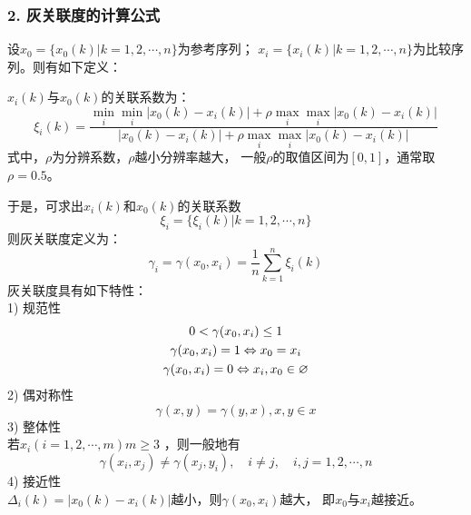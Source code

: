 \subsubsection*{2. 灰关联度的计算公式} 
设$x_0=\{x_0(k)|k=1,2, \cdots ,n\}$为参考序列；
$x_i=\{x_i(k)|k=1,2, \cdots ,n\}$为比较序列。则有如下定义：

$x_i(k)$与$x_0(k)$的关联系数为：
\begin{equation}
\xi_i(k)=\frac{\underset{i}{\min}\underset{i}{\min}|x_0(k)-x_i(k)|
				+\rho\underset{i}{\max}\underset{i}{\max}|x_0(k)-x_i(k)|}
			  {|x_0(k)-x_i(k)|
				+\rho\underset{i}{\max}\underset{i}{\max}|x_0(k)-x_i(k)|}
\end{equation}
式中，$\rho$为分辨系数，$\rho$越小分辨率越大，
一般$\rho$的取值区间为$[0,1]$，通常取$\rho=0.5$。

于是，可求出$x_i(k)$和$x_0(k)$的关联系数
\begin{equation}
\xi_i=\{\xi_i(k)|k=1,2,\cdots,n\}
\end{equation}
则灰关联度定义为：
\begin{equation}
\gamma_i=\gamma(x_0,x_i)=\frac{1}{n}\sum_{k=1}^{n}\xi_i(k)
\end{equation}
灰关联度具有如下特性： \\
1) 规范性
\begin{gather}
0 < \gamma(x_0,x_i) \le 1 \notag \\
\gamma(x_0,x_i) = 1 \Leftrightarrow x_0=x_i \\
\gamma(x_0,x_i) = 0 \Leftrightarrow x_i,x_0 \in \varnothing \notag
\end{gather}
2) 偶对称性
\begin{equation}
\gamma(x,y)=\gamma(y,x), x,y \in x
\end{equation}
3) 整体性 \\ 
若$x_i(i=1,2,\cdots,m) m \ge 3$ ，则一般地有
\begin{equation}
\gamma(x_i,x_j) \neq \gamma(x_j, y_i),\quad i\neq j,\quad i,j=1,2,\cdots,n
\end{equation}
4) 接近性 \\
$\Delta_i(k)=|x_0(k)-x_i(k)|$越小，则$\gamma(x_0,x_i)$越大，
即$x_0$与$x_i$越接近。
\\

